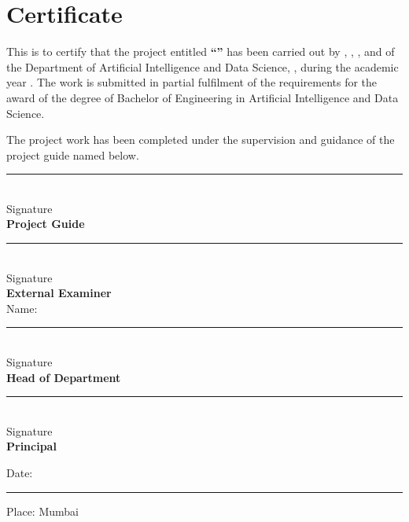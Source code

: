 \chapter*{Certificate}

This is to certify that the project entitled
\textbf{``\projecttitle''} has been carried out by
\textbf{\studentone}, \textbf{\studenttwo}, \textbf{\studentthree},
and \textbf{\studentfour} of the Department of Artificial Intelligence
and Data Science, \fullinstitutename, during the academic year
\academicYear. The work is submitted in partial fulfilment of the
requirements for the award of the degree of Bachelor of Engineering in
Artificial Intelligence and Data Science.

\vspace{0.4cm}

The project work has been completed under the supervision and guidance
of the project guide named below.

\vspace{2.2cm}

\newcommand{\certificateblock}[2]{%
  \begin{minipage}[t][1.9cm][t]{0.46\textwidth}
  \vspace{0pt}%
  \centering
  \rule{5cm}{0.4pt}\\[3pt]
  Signature\\[2pt]
  \textbf{#1}\\
  #2
  \end{minipage}%
}
\noindent\certificateblock{Project Guide}{\guidename}\hfill
\certificateblock{External Examiner}{Name:~\externalexaminername}

\vspace{1.9cm}

\noindent\certificateblock{Head of Department}{\hodname}\hfill
\certificateblock{Principal}{\principalname}

\vfill

\noindent Date: \rule{4cm}{0.4pt}
\hfill
Place: Mumbai
